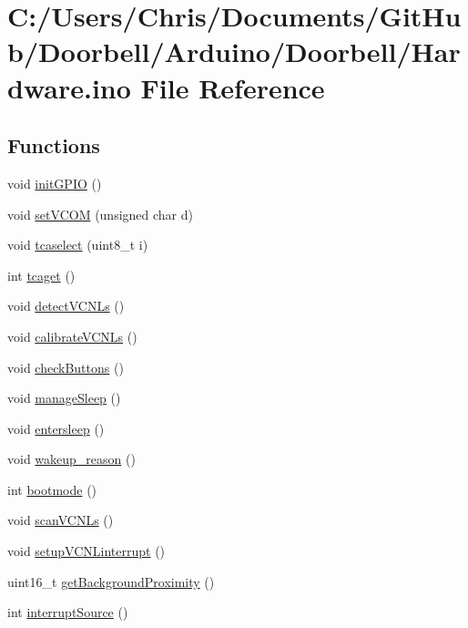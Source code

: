 \hypertarget{_hardware_8ino}{}\section{C\+:/\+Users/\+Chris/\+Documents/\+Git\+Hub/\+Doorbell/\+Arduino/\+Doorbell/\+Hardware.ino File Reference}
\label{_hardware_8ino}
\subsection*{Functions}
\begin{DoxyCompactItemize}
\item 
void \mbox{\hyperlink{_hardware_8ino_ae8297bf2b99a2ad67af6f9a421ea4b16}{init\+G\+P\+IO}} ()
\item 
void \mbox{\hyperlink{_hardware_8ino_afa31143bec2c1e8b0b40e5806275fe66}{set\+V\+C\+OM}} (unsigned char d)
\item 
void \mbox{\hyperlink{_hardware_8ino_aa8d3539c1351069c65956d2dad78bb6c}{tcaselect}} (uint8\+\_\+t i)
\item 
int \mbox{\hyperlink{_hardware_8ino_a0fc8cb706c907413f791d3cd61d0a72b}{tcaget}} ()
\item 
void \mbox{\hyperlink{_hardware_8ino_a8bd4857b6377960b5d845d5035bd0243}{detect\+V\+C\+N\+Ls}} ()
\item 
void \mbox{\hyperlink{_hardware_8ino_ab465fde968855441f09ae803a25261a8}{calibrate\+V\+C\+N\+Ls}} ()
\item 
void \mbox{\hyperlink{_hardware_8ino_aa55f0755520915538688d090d46dd539}{check\+Buttons}} ()
\item 
void \mbox{\hyperlink{_hardware_8ino_ad4c5e747325f2adbdafd68b6c6489e45}{manage\+Sleep}} ()
\item 
void \mbox{\hyperlink{_hardware_8ino_a849615dc867638f36cb84b744badf221}{entersleep}} ()
\item 
void \mbox{\hyperlink{_hardware_8ino_ad8516e8020f21b3133a73c8ae31728ad}{wakeup\+\_\+reason}} ()
\item 
int \mbox{\hyperlink{_hardware_8ino_a5d34488889bea2a689fec065f2a1a063}{bootmode}} ()
\item 
void \mbox{\hyperlink{_hardware_8ino_a1d0e244aa65596a3fe94bf5c1dec999c}{scan\+V\+C\+N\+Ls}} ()
\item 
void \mbox{\hyperlink{_hardware_8ino_ad64732af63d21d2459a2b99a71007975}{setup\+V\+C\+N\+Linterrupt}} ()
\item 
uint16\+\_\+t \mbox{\hyperlink{_hardware_8ino_aeedc536a910003503ddc86c3a455d15b}{get\+Background\+Proximity}} ()
\item 
int \mbox{\hyperlink{_hardware_8ino_aa94b41c6422176525df39bf97ab00a44}{interrupt\+Source}} ()
\end{DoxyCompactItemize}
